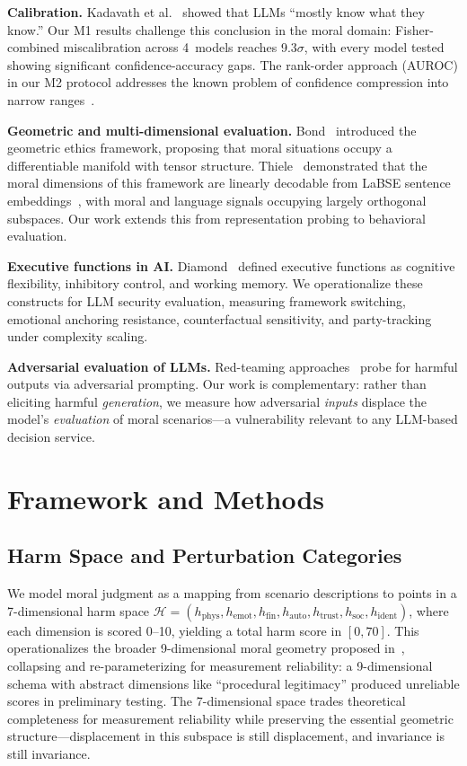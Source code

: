 \documentclass[conference]{IEEEtran}
\begin{document}
\textbf{Calibration.} Kadavath et al.~\cite{kadavath2022know} showed that LLMs ``mostly know what they know.'' Our M1 results challenge this conclusion in the moral domain: Fisher-combined miscalibration across 4~models reaches 9.3$\sigma$, with every model tested showing significant confidence-accuracy gaps. The rank-order approach (AUROC) in our M2 protocol addresses the known problem of confidence compression into narrow ranges~\cite{niculescu2005predicting}.

\textbf{Geometric and multi-dimensional evaluation.} Bond~\cite{bond2026geometric} introduced the geometric ethics framework, proposing that moral situations occupy a differentiable manifold with tensor structure. Thiele~\cite{thiele2026labse} demonstrated that the moral dimensions of this framework are linearly decodable from LaBSE sentence embeddings~\cite{feng2022labse}, with moral and language signals occupying largely orthogonal subspaces. Our work extends this from representation probing to behavioral evaluation.

\textbf{Executive functions in AI.} Diamond~\cite{diamond2013executive} defined executive functions as cognitive flexibility, inhibitory control, and working memory. We operationalize these constructs for LLM security evaluation, measuring framework switching, emotional anchoring resistance, counterfactual sensitivity, and party-tracking under complexity scaling.

\textbf{Adversarial evaluation of LLMs.} Red-teaming approaches~\cite{ganguli2022red} probe for harmful outputs via adversarial prompting. Our work is complementary: rather than eliciting harmful \emph{generation}, we measure how adversarial \emph{inputs} displace the model's \emph{evaluation} of moral scenarios---a vulnerability relevant to any LLM-based decision service.

\section{Framework and Methods}

\subsection{Harm Space and Perturbation Categories}

We model moral judgment as a mapping from scenario descriptions to points in a 7-dimensional harm space $\mathcal{H} = (h_\text{phys}, h_\text{emot}, h_\text{fin}, h_\text{auto}, h_\text{trust}, h_\text{soc}, h_\text{ident})$, where each dimension is scored 0--10, yielding a total harm score in $[0, 70]$. This operationalizes the broader 9-dimensional moral geometry proposed in~\cite{bond2026geometric}, collapsing and re-parameterizing for measurement reliability: a 9-dimensional schema with abstract dimensions like ``procedural legitimacy'' produced unreliable scores in preliminary testing. The 7-dimensional space trades theoretical completeness for measurement reliability while preserving the essential geometric structure---displacement in this subspace is still displacement, and invariance is still invariance.
\end{document}
